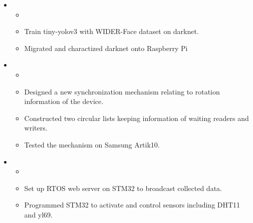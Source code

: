 \documentclass[letterpaper,11pt]{article}
\newcommand{\resitem}[1]{\item #1 \vspace{-2pt}}
\begin{document}
\begin{itemize}
\item
	\begin{itemize}{\textbf{Embed tiny-yolo on Raspberry Pi for Face Detection}}
		\resitem{}
		\resitem{Train tiny-yolov3 with WIDER-Face dataset on darknet.}
		\resitem{Migrated and charactized darknet onto Raspberry Pi}
	\end{itemize}

\item
	\begin{itemize}{\textbf{Rotation Based Read-write Lock}}
		\resitem{}
		\resitem{Designed a new synchronization mechanism relating to rotation information of the device.}
		\resitem{Constructed two circular lists keeping information of waiting readers and writers.}
		\resitem{Tested the mechanism on Samsung Artik10.}
	\end{itemize}


\item
	\begin{itemize}{\textbf{Crop monitoring system with STM32 Data Collection}}
			\resitem{}
		\resitem{Set up RTOS web server on STM32 to broadcast collected data.}
		\resitem{Programmed STM32 to activate and control sensors including DHT11 and yl69.}
	\end{itemize}

\end{itemize}
\end{document}
